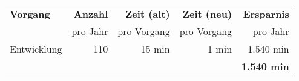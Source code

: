 \begin{tabular}{lrrrr}
    \rowcolor{heading}\textbf{Vorgang}  & \textbf{Anzahl} & \textbf{Zeit (alt)} & \textbf{Zeit (neu)} & \textbf{Ersparnis}\\
    \rowcolor{heading}\textbf{}         & pro Jahr        & pro Vorgang         & pro Vorgang         & pro Jahr\\
    \rowcolor{odd} Entwicklung          & 110             & 15 min              & 1 min               & 1.540 min\\
    \hline
    \hline
    \rowcolor{heading}\textbf{} & \textbf{} & \textbf{} & \textbf{} & \textbf{1.540 min} \\
    \end{tabular}